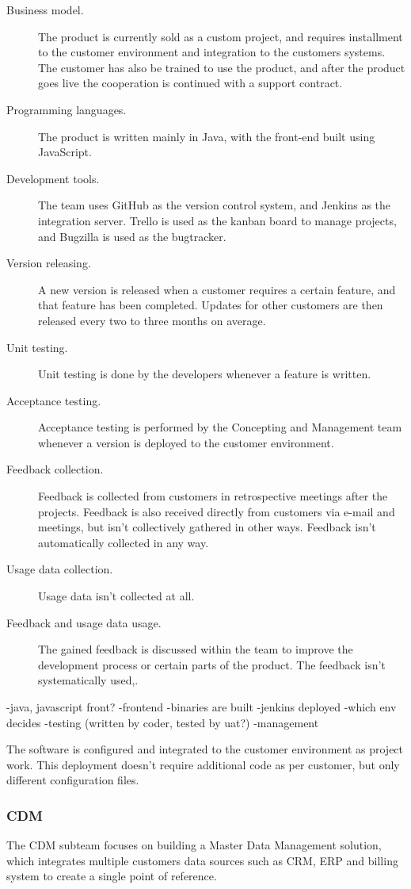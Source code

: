 \documentclass[english]{tktltiki2}
\theoremstyle{definition}
\theoremstyle{remark}
\begin{document}
\begin{description}
  \item[Business model.] The product is currently sold as a custom project, and requires installment to the customer environment and integration to the customers systems. The customer has also be trained to use the product, and after the product goes live the cooperation is continued with a support contract.
  \item[Programming languages.] The product is written mainly in Java, with the front-end built using JavaScript. 
  \item[Development tools.] The team uses GitHub as the version control system, and Jenkins as the integration server. Trello is used as the kanban board to manage projects, and Bugzilla is used as the bugtracker. 
  \item[Version releasing.] A new version is released when a customer requires a certain feature, and that feature has been completed. Updates for other customers are then released every two to three months on average.
  \item[Unit testing.] Unit testing is done by the developers whenever a feature is written. 
  \item[Acceptance testing.] Acceptance testing is performed by the Concepting and Management team whenever a version is deployed to the customer environment. 
  \item[Feedback collection.] Feedback is collected from customers in retrospective meetings after the projects. Feedback is also received directly from customers via e-mail and meetings, but isn't collectively gathered in other ways. Feedback isn't automatically collected in any way.
  \item[Usage data collection.] Usage data isn't collected at all.
  \item[Feedback and usage data usage.] The gained feedback is discussed within the team to improve the development process or certain parts of the product. The feedback isn't systematically used,. 
\end{description}

-java, javascript front?
-frontend
-binaries are built
-jenkins deployed
-which env decides
-testing (written by coder, tested by uat?)
-management

The software is configured and integrated to the customer environment as project work. This deployment doesn't require additional code as per customer, but only different configuration files. 

\subsubsection{CDM} 
The CDM subteam focuses on building a Master Data Management \cite{loshin2010master} solution, which integrates multiple customers data sources such as CRM, ERP and billing system to create a single point of reference. 
\end{document}
